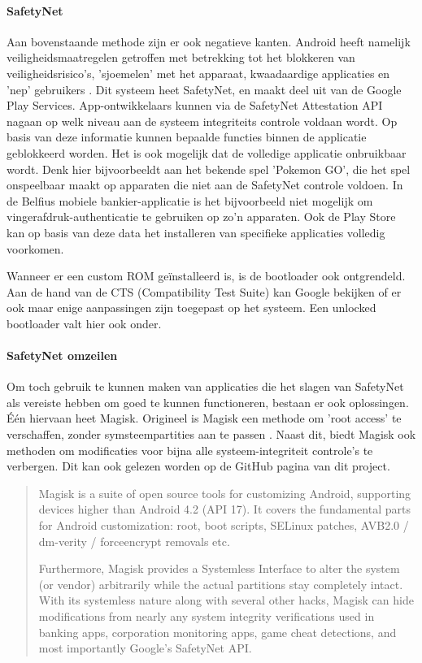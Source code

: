 \paragraph*{SafetyNet}

Aan bovenstaande methode zijn er ook negatieve kanten. Android heeft namelijk veiligheidsmaatregelen getroffen met betrekking tot het blokkeren van veiligheidsrisico's, 'sjoemelen' met het apparaat, kwaadaardige applicaties en 'nep' gebruikers \autocite{android_safetynet}. Dit systeem heet SafetyNet, en maakt deel uit van de Google Play Services. App-ontwikkelaars kunnen via de SafetyNet Attestation API nagaan op welk niveau aan de systeem integriteits controle voldaan wordt. Op basis van deze informatie kunnen bepaalde functies binnen de applicatie geblokkeerd worden. Het is ook mogelijk dat de volledige applicatie onbruikbaar wordt. Denk hier bijvoorbeeldt aan het bekende spel 'Pokemon GO', die het spel onspeelbaar maakt op apparaten die niet aan de SafetyNet controle voldoen. In de Belfius mobiele bankier-applicatie is het bijvoorbeeld niet mogelijk om vingerafdruk-authenticatie te gebruiken op zo'n apparaten. Ook de Play Store kan op basis van deze data het installeren van specifieke applicaties volledig voorkomen.

Wanneer er een custom ROM geïnstalleerd is, is de bootloader ook ontgrendeld. Aan de hand van de CTS (Compatibility Test Suite) kan Google bekijken of er ook maar enige aanpassingen zijn toegepast op het systeem. Een unlocked bootloader valt hier ook onder.

\paragraph{SafetyNet omzeilen}
Om toch gebruik te kunnen maken van applicaties die het slagen van SafetyNet als vereiste hebben om goed te kunnen functioneren, bestaan er ook oplossingen. Één hiervaan heet Magisk. Origineel is Magisk een methode om 'root access' te verschaffen, zonder symsteempartities aan te passen \autocite{topjohnwu_magisk}. Naast dit, biedt Magisk ook methoden om modificaties voor bijna alle systeem-integriteit controle's te verbergen. Dit kan ook gelezen worden op de GitHub pagina van dit project.
\blockcquote{topjohnwu_magiskgithub}{
 Magisk is a suite of open source tools for customizing Android, supporting devices higher than Android 4.2 (API 17). It covers the fundamental parts for Android customization: root, boot scripts, SELinux patches, AVB2.0 / dm-verity / forceencrypt removals etc.
 
 Furthermore, Magisk provides a Systemless Interface to alter the system (or vendor) arbitrarily while the actual partitions stay completely intact. With its systemless nature along with several other hacks, Magisk can hide modifications from nearly any system integrity verifications used in banking apps, corporation monitoring apps, game cheat detections, and most importantly Google's SafetyNet API.
}

